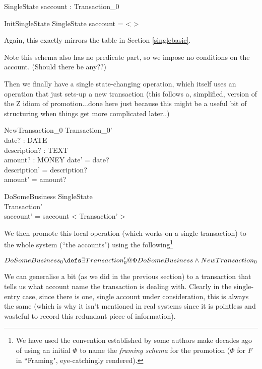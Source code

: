 \documentclass[11pt]{amsart}
\begin{document}
\begin{schema}{SingleState}
saccount : \seq Transaction_0
\end{schema}

\begin{schema}{InitSingleState}
SingleState
\where
saccount = < >
\end{schema}

Again, this exactly mirrors the table in Section \ref{singlebasic}. 

Note this schema also has no predicate part, so we impose no conditions on the account. (Should there be any??)

Then we finally have a single state-changing operation, which itself uses an operation that just sets-up a new transaction (this follows a, simplified, version of the Z idiom of promotion...done here just because this might be a useful bit of structuring when things get more complicated later..)

\begin{schema}{NewTransaction_0}
Transaction_0'\\
date? : DATE\\
description? : TEXT\\
amount? : MONEY
\where
date' = date?\\
description' = description?\\
amount' = amount?
\end{schema}

\begin{schema}{\Phi DoSomeBusiness}
\Delta SingleState\\
Transaction'\\
\where
saccount' = saccount \cat < \theta Transaction' >
\end{schema}

We then promote this local operation (which works on a single transaction) to the whole system (``the accounts") using the following\footnote{We have used the convention established by some authors make decades ago of using an initial $\Phi$ to name the \emph{framing schema} for the promotion ($\Phi$ for $F$ in ``Framing", eye-catchingly rendered).}

\[
DoSomeBusiness_0 \defs \exists Transaction_0' @ \Phi DoSomeBusiness \land New Transaction_0
\]

We can generalise a bit (as we did in the previous section) to a transaction that tells us what account name the transaction is dealing with. Clearly in the single-entry case, since there is one, single account under consideration, this is always the same (which is why it isn't mentioned in real systems since it is pointless and wasteful to record this redundant piece of information).
\end{document}
